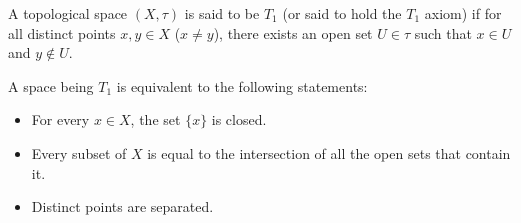 \documentclass{article}
\begin{document}
A topological space $(X,\tau)$ is said to be $T_1$ (or said to hold the $T_1$ axiom) if for all distinct points $x,y\in X$ ($x\neq y$), there exists an open set $U\in\tau$ such that $x\in U$ and $y\notin U$.

A space being $T_1$ is equivalent to the following statements:
\begin{itemize}
\item For every $x\in X$, the set $\{x\}$ is closed.
\item Every subset of $X$ is equal to the intersection of all the open sets that contain it.
\item Distinct points are separated.
\end{itemize}
\end{document}
